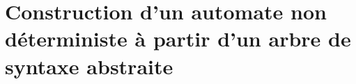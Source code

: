 




% 


\section{Construction d'un automate non d{\'e}terministe {\`a} partir d'un arbre de syntaxe abstraite}


